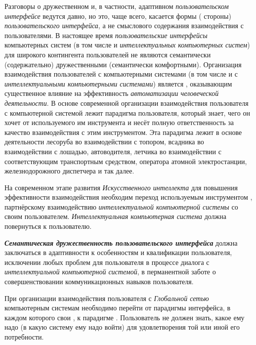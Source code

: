 Разговоры о дружественном и, в частности, адаптивном \textit{пользовательском интерфейсе} ведутся давно, но это, чаще всего, касается формы ( стороны) \textit{пользовательского интерфейса}, а не смыслового содержания взаимодействия с пользователями. В настоящее время \textit{пользовательские интерфейсы} компьютерных систем (в том числе и \textit{интеллектуальных компьютерных систем}) для широкого контингента пользователей не являются семантически (содержательно) дружественными (семантически комфортными). Организация взаимодействия пользователей с компьютерными системами (в том числе и с \textit{интеллектуальными компьютерными системами}) является , оказывающим существенное влияние на эффективность \textit{автоматизации человеческой деятельности}. В основе современной организации взаимодействия пользователя с компьютерной системой лежит парадигма  пользователя, который знает, чего он хочет от используемого им инструмента и несёт полную ответственность за качество взаимодействия с этим инструментом. Эта парадигма лежит в основе деятельности лесоруба во взаимодействии с топором, всадника во взаимодействии с лошадью, автоводителя, летчика во взаимодействии с соответствующим транспортным средством, оператора атомной электростанции, железнодорожного диспетчера и так далее.

На современном этапе развития \textit{Искусственного интеллекта} для повышения эффективности взаимодействия необходим переход    используемым инструментом   , партнёрскому взаимодействию \textit{интеллектуальной компьютерной системы} со своим пользователем. \textit{Интеллектуальная компьютерная система} должна повернуться  к пользователю.

\textbf{\textit{Семантическая дружественность пользовательского интерфейса}} должна заключаться в адаптивности к особенностям и квалификации пользователя, исключении любых проблем для пользователя в процессе диалога с \textit{интеллектуальной компьютерной системой}, в перманентной заботе о совершенствовании коммуникационных навыков пользователя.

При организации взаимодействия пользователя с \textit{Глобальной сетью} компьютерным системам необходимо перейти от парадигмы  интерфейса, в каждом  которого свои , к парадигме . Пользователь не должен знать, какое  ему надо  (в какую систему ему надо войти) для удовлетворения той или иной его потребности.

